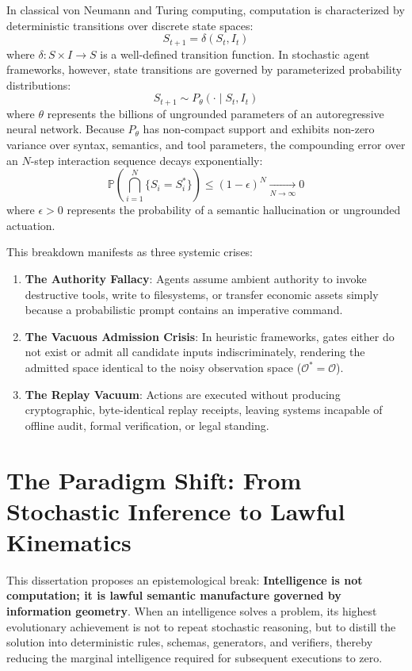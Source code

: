 \documentclass[12pt,oneside,a4paper]{book}
\theoremstyle{definition}
\theoremstyle{plain}
\theoremstyle{remark}
\begin{document}
In classical von Neumann and Turing computing, computation is characterized by deterministic transitions over discrete state spaces:
\begin{equation}
    S_{t+1} = \delta(S_t, I_t)
\end{equation}
where $\delta: S \times I \to S$ is a well-defined transition function. In stochastic agent frameworks, however, state transitions are governed by parameterized probability distributions:
\begin{equation}
    S_{t+1} \sim P_\theta(\cdot \mid S_t, I_t)
\end{equation}
where $\theta$ represents the billions of ungrounded parameters of an autoregressive neural network. Because $P_\theta$ has non-compact support and exhibits non-zero variance over syntax, semantics, and tool parameters, the compounding error over an $N$-step interaction sequence decays exponentially:
\begin{equation}
    \mathbb{P}\left(\bigcap_{i=1}^N \{S_i = S_i^*\}\right) \le (1 - \epsilon)^N \xrightarrow[N \to \infty]{} 0
\end{equation}
where $\epsilon > 0$ represents the probability of a semantic hallucination or ungrounded actuation.

This breakdown manifests as three systemic crises:
\begin{enumerate}
    \item \textbf{The Authority Fallacy}: Agents assume ambient authority to invoke destructive tools, write to filesystems, or transfer economic assets simply because a probabilistic prompt contains an imperative command.
    \item \textbf{The Vacuous Admission Crisis}: In heuristic frameworks, gates either do not exist or admit all candidate inputs indiscriminately, rendering the admitted space identical to the noisy observation space ($\mathcal{O}^* = \mathcal{O}$).
    \item \textbf{The Replay Vacuum}: Actions are executed without producing cryptographic, byte-identical replay receipts, leaving systems incapable of offline audit, formal verification, or legal standing.
\end{enumerate}

\section{The Paradigm Shift: From Stochastic Inference to Lawful Kinematics}
This dissertation proposes an epistemological break: \textbf{Intelligence is not computation; it is lawful semantic manufacture governed by information geometry}. When an intelligence solves a problem, its highest evolutionary achievement is not to repeat stochastic reasoning, but to distill the solution into deterministic rules, schemas, generators, and verifiers, thereby reducing the marginal intelligence required for subsequent executions to zero.
\end{document}
